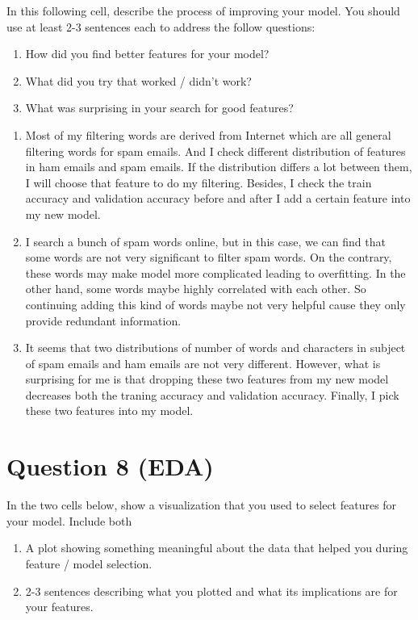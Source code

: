 \documentclass[11pt]{article}
\providecommand{\tightlist}{%
      \setlength{\itemsep}{0pt}\setlength{\parskip}{0pt}}
\begin{document}
In this following cell, describe the process of improving your model.
You should use at least 2-3 sentences each to address the follow
questions:

\begin{enumerate}
\def\labelenumi{\arabic{enumi}.}
\tightlist
\item
  How did you find better features for your model?
\item
  What did you try that worked / didn't work?
\item
  What was surprising in your search for good features?
\end{enumerate}

    \begin{enumerate}
\def\labelenumi{\arabic{enumi}.}
\item
  Most of my filtering words are derived from Internet which are all
  general filtering words for spam emails. And I check different
  distribution of features in ham emails and spam emails. If the
  distribution differs a lot between them, I will choose that feature to
  do my filtering. Besides, I check the train accuracy and validation
  accuracy before and after I add a certain feature into my new model.
\item
  I search a bunch of spam words online, but in this case, we can find
  that some words are not very significant to filter spam words. On the
  contrary, these words may make model more complicated leading to
  overfitting. In the other hand, some words maybe highly correlated
  with each other. So continuing adding this kind of words maybe not
  very helpful cause they only provide redundant information.
\item
  It seems that two distributions of number of words and characters in
  subject of spam emails and ham emails are not very different. However,
  what is surprising for me is that dropping these two features from my
  new model decreases both the traning accuracy and validation accuracy.
  Finally, I pick these two features into my model.
\end{enumerate}

    \section{Question 8 (EDA)}\label{question-8-eda}

In the two cells below, show a visualization that you used to select
features for your model. Include both

\begin{enumerate}
\def\labelenumi{\arabic{enumi}.}
\tightlist
\item
  A plot showing something meaningful about the data that helped you
  during feature / model selection.
\item
  2-3 sentences describing what you plotted and what its implications
  are for your features.
\end{enumerate}
\end{document}
